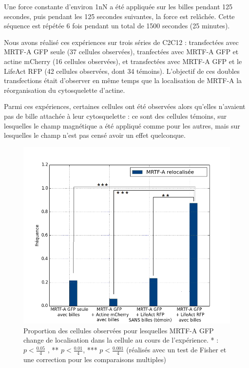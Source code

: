 Une force constante d'environ 1nN a été appliquée sur les billes pendant 125 secondes, puis pendant les 125 secondes suivantes, la force est relâchée. Cette séquence est répétée 6 fois pendant un total de 1500 secondes (25 minutes). 

Nous avons réalisé ces expériences sur trois séries de C2C12 : transfectées avec MRTF-A GFP seule (37 cellules observées), tranfectées avec MRTF-A GFP et actine mCherry (16 cellules observées), et transfectées avec MRTF-A GFP et le LifeAct RFP (42 cellules observées, dont 34 témoins). 
L'objectif de ces doubles transfections était d'observer en même temps que la localisation de MRTF-A la réorganisation du cytosquelette d'actine. 

Parmi ces expériences, certaines cellules ont été observées alors qu'elles n'avaient pas de bille attachée à leur cytosquelette : ce sont des cellules témoins, sur lesquelles le champ magnétique a été appliqué comme pour les autres, mais sur lesquelles le champ n'est pas censé avoir un effet quelconque. 

\begin{figure}
\includegraphics[scale=0.4]{Figures/Pinces_MRTFA_stars_colors.png} 
\caption{Proportion des cellules observées pour lesquelles MRTF-A GFP change de localisation dans la cellule au cours de l'expérience. * : $p<\frac{0.05}{4}$ , ** $p<\frac{0.01}{4}$, *** $p<\frac{0.001}{4}$ (réalisés avec un test de Fisher et une correction pour les comparaisons multiples)\label{MRTF-A Pinces}}
\end{figure}

